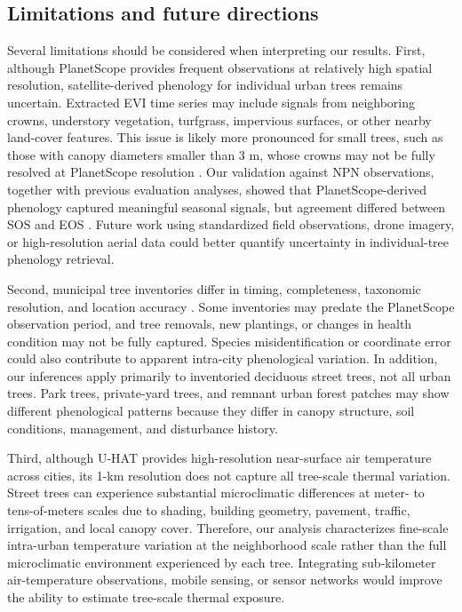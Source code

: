 \subsection{Limitations and future directions}

Several limitations should be considered when interpreting our results. First, although PlanetScope provides frequent observations at relatively high spatial resolution, satellite-derived phenology for individual urban trees remains uncertain. Extracted EVI time series may include signals from neighboring crowns, understory vegetation, turfgrass, impervious surfaces, or other nearby land-cover features. This issue is likely more pronounced for small trees, such as those with canopy diameters smaller than 3 m, whose crowns may not be fully resolved at PlanetScope resolution \citep{Song2025SRS, Wu2021ISPRS}. Our validation against NPN observations, together with previous evaluation analyses, showed that PlanetScope-derived phenology captured meaningful seasonal signals, but agreement differed between SOS and EOS \citep{Song2025SRS, Zhao2022RSE}. Future work using standardized field observations, drone imagery, or high-resolution aerial data could better quantify uncertainty in individual-tree phenology retrieval.

Second, municipal tree inventories differ in timing, completeness, taxonomic resolution, and location accuracy \citep{McCoy2022eLife}. Some inventories may predate the PlanetScope observation period, and tree removals, new plantings, or changes in health condition may not be fully captured. Species misidentification or coordinate error could also contribute to apparent intra-city phenological variation. In addition, our inferences apply primarily to inventoried deciduous street trees, not all urban trees. Park trees, private-yard trees, and remnant urban forest patches may show different phenological patterns because they differ in canopy structure, soil conditions, management, and disturbance history.

Third, although U-HAT provides high-resolution near-surface air temperature across cities, its 1-km resolution does not capture all tree-scale thermal variation. Street trees can experience substantial microclimatic differences at meter- to tens-of-meters scales due to shading, building geometry, pavement, traffic, irrigation, and local canopy cover. Therefore, our analysis characterizes fine-scale intra-urban temperature variation at the neighborhood scale rather than the full microclimatic environment experienced by each tree. Integrating sub-kilometer air-temperature observations, mobile sensing, or sensor networks would improve the ability to estimate tree-scale thermal exposure.

